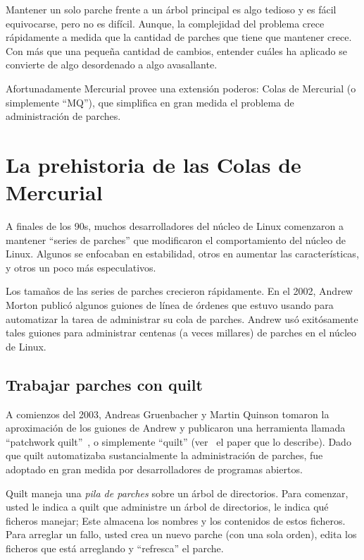 Mantener un solo parche frente a un árbol principal es algo tedioso y
es fácil equivocarse, pero no es difícil.  Aunque, la complejidad del
problema crece rápidamente a medida que la cantidad de parches que
tiene que mantener crece.  Con más que una pequeña cantidad de
cambios, entender cuáles ha aplicado se convierte de algo desordenado
a algo avasallante.

Afortunadamente Mercurial provee una extensión poderos: Colas de
Mercurial (o simplemente ``MQ''), que simplifica en gran medida el
problema de administración de parches.

\section{La prehistoria de las Colas de Mercurial}
\label{sec:mq:history}

A finales de los 90s, muchos desarrolladores del núcleo de Linux
comenzaron a mantener ``series de parches'' que modificaron el
comportamiento del núcleo de Linux.  Algunos se enfocaban en
estabilidad, otros en aumentar las características, y otros un poco
más especulativos.

Los tamaños de las series de parches crecieron rápidamente.  En el
2002, Andrew Morton publicó algunos guiones de línea de órdenes que
estuvo usando para automatizar la tarea de administrar su cola de
parches.  Andrew usó exitósamente tales guiones para administrar
centenas (a veces millares) de parches en el núcleo de Linux.

\subsection{Trabajar parches con quilt}
\label{sec:mq:quilt}

A comienzos del 2003, Andreas Gruenbacher y Martin Quinson tomaron la
aproximación de los guiones de Andrew y publicaron una herramienta
llamada
``patchwork quilt''~\cite{web:quilt}, o simplemente ``quilt''
(ver~\cite{gruenbacher:2005} el paper que lo describe).  Dado que
quilt automatizaba sustancialmente la administración de parches, fue
adoptado en gran medida por desarrolladores de programas abiertos.

Quilt maneja una \emph{pila de parches} sobre un árbol de directorios.
Para comenzar, usted le indica a quilt que administre un árbol de
directorios, le indica qué ficheros manejar; Este almacena los nombres
y los contenidos de estos ficheros.  Para arreglar un fallo, usted
crea un nuevo parche (con una sola orden), edita los ficheros que está
arreglando y ``refresca'' el parche.

